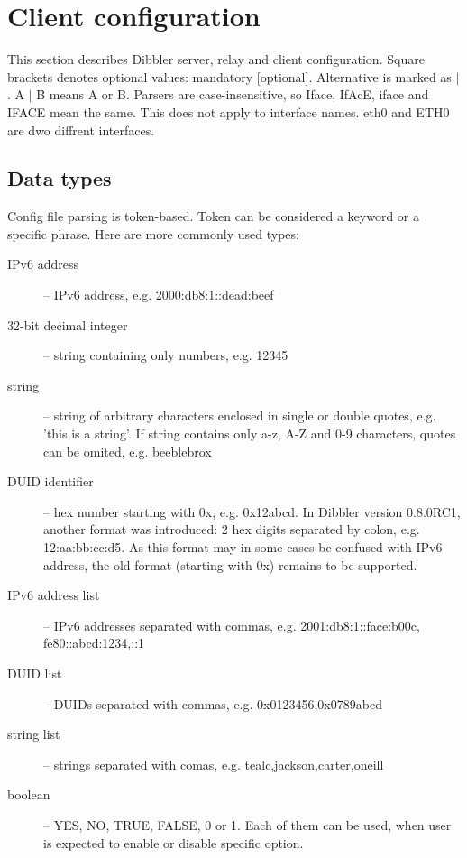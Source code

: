 \newpage
\section{Client configuration}

This section describes Dibbler server, relay  and client
configuration. Square brackets denotes optional values: mandatory
[optional]. Alternative is marked as $\mid$. A $\mid$ B means A or
B. Parsers are case-insensitive, so Iface, IfAcE, iface and IFACE mean
the same. This does not apply to interface names. eth0 and
ETH0 are dwo diffrent interfaces.

\subsection{Data types}
Config file parsing is token-based. Token can be considered a keyword
or a specific phrase. Here are more commonly used types:
\begin{description}
\item[IPv6 address] -- IPv6 address, e.g. 2000:db8:1::dead:beef
\item[32-bit decimal integer] -- string containing only numbers, e.g. 12345
\item[string] -- string of arbitrary characters enclosed in single or double
  quotes, e.g. 'this is a string'. If string contains only a-z, A-Z and
  0-9 characters, quotes can be omited, e.g. beeblebrox
\item[DUID identifier] -- hex number starting with 0x,
  e.g. 0x12abcd. In Dibbler version 0.8.0RC1, another format was
  introduced: 2 hex digits separated by colon, e.g. 12:aa:bb:cc:d5. As
  this format may in some cases be confused with IPv6 address, the old
  format (starting with 0x) remains to be supported.
\item[IPv6 address list] -- IPv6 addresses separated with commas,
           e.g. 2001:db8:1::face:b00c, fe80::abcd:1234,::1
\item[DUID list] -- DUIDs separated with commas, e.g. 0x0123456,0x0789abcd
\item[string list] -- strings separated with comas, e.g. tealc,jackson,carter,oneill
\item[boolean] -- YES, NO, TRUE, FALSE, 0 or 1. Each of them can be
  used, when user is expected to enable or disable specific option.
\end{description}

